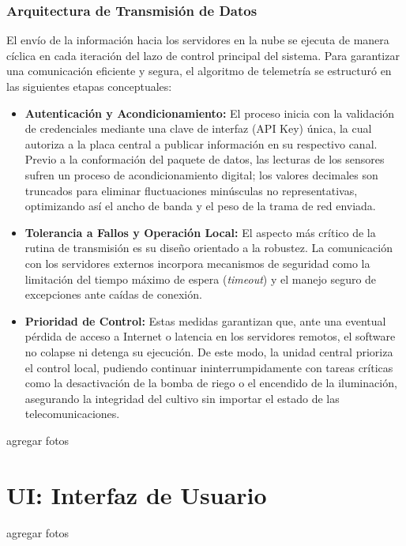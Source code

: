 \subsubsection{Arquitectura de Transmisión de Datos}

El envío de la información hacia los servidores en la nube se ejecuta de manera cíclica en cada iteración del lazo de control principal del sistema. Para garantizar una comunicación eficiente y segura, el algoritmo de telemetría se estructuró en las siguientes etapas conceptuales:

\begin{itemize}
    \item \textbf{Autenticación y Acondicionamiento:} El proceso inicia con la validación de credenciales mediante una clave de interfaz (API Key) única, la cual autoriza a la placa central a publicar información en su respectivo canal. Previo a la conformación del paquete de datos, las lecturas de los sensores sufren un proceso de acondicionamiento digital; los valores decimales son truncados para eliminar fluctuaciones minúsculas no representativas, optimizando así el ancho de banda y el peso de la trama de red enviada.
    
    \item \textbf{Tolerancia a Fallos y Operación Local:} El aspecto más crítico de la rutina de transmisión es su diseño orientado a la robustez. La comunicación con los servidores externos incorpora mecanismos de seguridad como la limitación del tiempo máximo de espera (\textit{timeout}) y el manejo seguro de excepciones ante caídas de conexión. 
    
    \item \textbf{Prioridad de Control:} Estas medidas garantizan que, ante una eventual pérdida de acceso a Internet o latencia en los servidores remotos, el software no colapse ni detenga su ejecución. De este modo, la unidad central prioriza el control local, pudiendo continuar ininterrumpidamente con tareas críticas como la desactivación de la bomba de riego o el encendido de la iluminación, asegurando la integridad del cultivo sin importar el estado de las telecomunicaciones.
\end{itemize}

agregar fotos

\section{UI: Interfaz de Usuario}

agregar fotos

